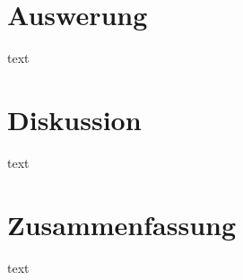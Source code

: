\documentclass[11pt]{scrartcl}
\begin{document}
    \section{Auswerung}
    \label{sec:auswertung}
    text


    \section{Diskussion}
    \label{sec:diskussion}
    text

    \section{Zusammenfassung}
    \label{sec:zusammenfassung}
    text

    \label{sec:literatur}
\end{document}
